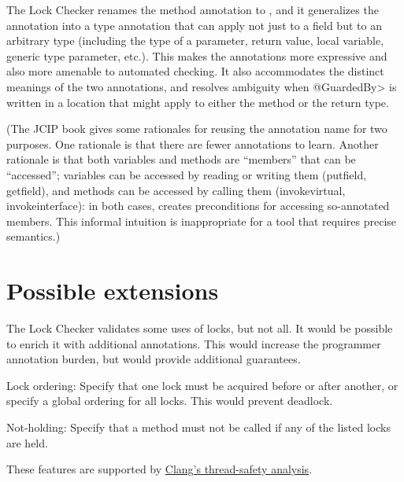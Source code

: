 The Lock Checker renames the method annotation to
, and it generalizes the 
 annotation into a type annotation
that can apply not just to a field but to an arbitrary type (including the
type of a parameter, return value, local variable, generic type parameter,
etc.).  This makes the annotations more expressive and also more amenable
to automated checking.  It also accommodates the distinct
meanings of the two annotations, and resolves ambiguity when \<@GuardedBy>
is written in a location that might apply to either the method or the
return type.

(The JCIP book gives some rationales for reusing the annotation name for
two purposes.  One rationale is
that there are fewer annotations to learn.  Another rationale is
that both variables and methods are ``members'' that can be ``accessed'';
variables can be accessed by reading or writing them (putfield, getfield),
and methods can be accessed by calling them (invokevirtual,
invokeinterface):  in both cases,  creates preconditions
for accessing so-annotated members.  This informal intuition is
inappropriate for a tool that requires precise semantics.)



\section{Possible extensions\label{lock-extensions}}

The Lock Checker validates some uses of locks, but not all.  It would be
possible to enrich it with additional annotations.  This would increase the
programmer annotation burden, but would provide additional guarantees.

Lock ordering:  Specify that one lock must be acquired before or after
another, or specify a global ordering for all locks.  This would prevent
deadlock.

Not-holding:  Specify that a method must not be called if any of the listed
locks are held.

These features are supported by 
\href{http://clang.llvm.org/docs/ThreadSafetyAnalysis.html}{Clang's
  thread-safety analysis}.



